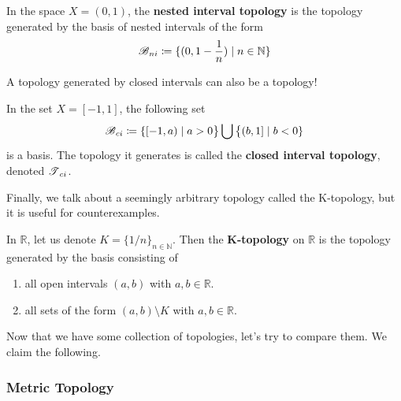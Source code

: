   \begin{example}
    In the space $X = (0,1)$, the \textbf{nested interval topology} is the topology generated by the basis of nested intervals of the form 
    \begin{equation}
      \B_{ni} \coloneqq \{ (0, 1-\frac{1}{n}) \mid n \in \mathbb{N} \}
    \end{equation}
  \end{example}

  A topology generated by closed intervals can also be a topology! 

  \begin{example}
    In the set $X = [-1, 1]$, the following set 
    \begin{equation}
      \B_{ci} \coloneqq \{ [-1, a) \mid a > 0 \big\} \bigcup \big\{ (b, 1] \mid b<0 \}
    \end{equation}
    is a basis. The topology it generates is called the \textbf{closed interval topology}, denoted $\T_{ci}$. 
  \end{example}

  Finally, we talk about a seemingly arbitrary topology called the K-topology, but it is useful for counterexamples.   

  \begin{example}[K-Topology]
    In $\mathbb{R}$, let us denote $K = \{1/n\}_{n \in \mathbb{N}}$. Then the \textbf{K-topology} on $\mathbb{R}$ is the topology generated by the basis consisting of 
    \begin{enumerate}
      \item all open intervals $(a, b)$ with $a, b \in \mathbb{R}$. 
      \item all sets of the form $(a, b) \setminus K$ with $a, b \in \mathbb{R}$. 
    \end{enumerate}
  \end{example} 

  Now that we have some collection of topologies, let's try to compare them. We claim the following. 

  \begin{theorem}
    
  \end{theorem}

\subsubsection{Metric Topology}

